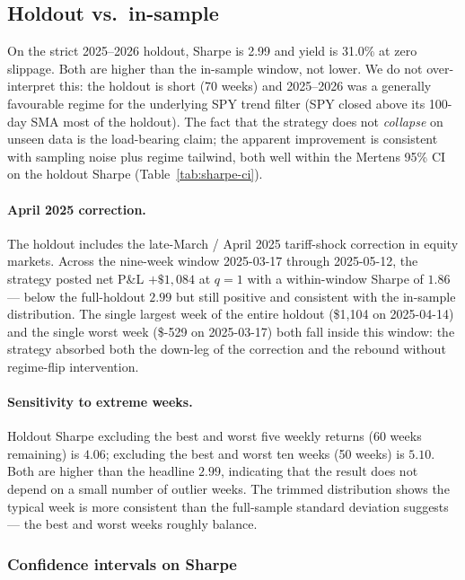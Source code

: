 \documentclass[11pt]{article}
\begin{document}
\subsection{Holdout vs.\ in-sample}

On the strict 2025--2026 holdout, Sharpe is 2.99 and yield is 31.0\%
at zero slippage. Both are higher than the in-sample window, not lower.
We do not over-interpret this: the holdout is short (70 weeks) and
2025--2026 was a generally favourable regime for the underlying SPY
trend filter (SPY closed above its 100-day SMA most of the holdout).
The fact that the strategy does not \emph{collapse} on unseen data is
the load-bearing claim; the apparent improvement is consistent with
sampling noise plus regime tailwind, both well within the Mertens
95\% CI on the holdout Sharpe (Table~\ref{tab:sharpe-ci}).

\paragraph{April 2025 correction.}
The holdout includes the late-March / April 2025 tariff-shock
correction in equity markets. Across the nine-week window 2025-03-17
through 2025-05-12, the strategy posted net P\&L $+\$1{,}084$ at $q=1$
with a within-window Sharpe of $1.86$ --- below the full-holdout
$2.99$ but still positive and consistent with the in-sample
distribution. The single largest week of the entire holdout
(\$1{,}104 on 2025-04-14) and the single worst week (\$-529 on
2025-03-17) both fall inside this window: the strategy absorbed both
the down-leg of the correction and the rebound without regime-flip
intervention.

\paragraph{Sensitivity to extreme weeks.}
Holdout Sharpe excluding the best and worst five weekly returns
(60 weeks remaining) is $4.06$; excluding the best and worst ten
weeks (50 weeks) is $5.10$. Both are higher than the headline
$2.99$, indicating that the result does not depend on a small number
of outlier weeks. The trimmed distribution shows the typical week
is more consistent than the full-sample standard deviation
suggests --- the best and worst weeks roughly balance.

\subsubsection{Confidence intervals on Sharpe}\label{sec:sharpe-ci}
\end{document}
